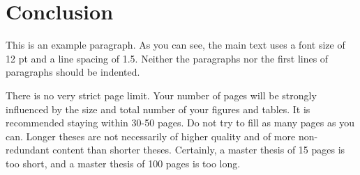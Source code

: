 
\chapter{Conclusion}

This is an example paragraph. As you can see, the main text uses a font size of 12 pt and a line spacing of 1.5. Neither the paragraphs nor the first lines of paragraphs should be indented.

There is no very strict page limit. Your number of pages will be strongly influenced by the size and total number of your figures and tables. It is recommended staying within 30-50 pages. Do not try to fill as many pages as you can. Longer theses are not necessarily of higher quality and of more non-redundant content than shorter theses. Certainly, a master thesis of 15 pages is too short, and a master thesis of 100 pages is too long.


\newpage
